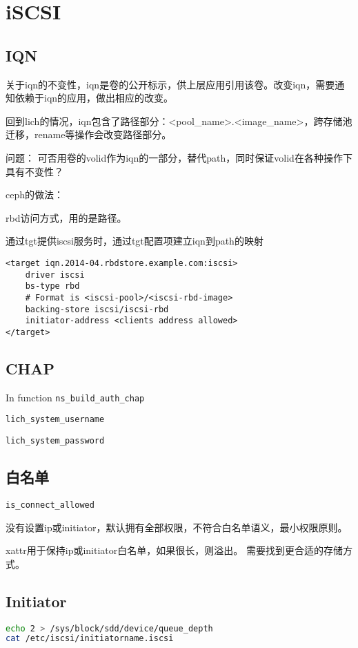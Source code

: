 \chapter{iSCSI}

\section{IQN}

关于iqn的不变性，iqn是卷的公开标示，供上层应用引用该卷。改变iqn，需要通知依赖于iqn的应用，做出相应的改变。

回到lich的情况，iqn包含了路径部分：<pool\_name>.<image\_name>，跨存储池迁移，rename等操作会改变路径部分。

问题： 可否用卷的volid作为iqn的一部分，替代path，同时保证volid在各种操作下具有不变性？

ceph的做法：
\begin{compactenum}
\item rbd访问方式，用的是路径。
\item 通过tgt提供iscsi服务时，通过tgt配置项建立iqn到path的映射
\end{compactenum}

\begin{lstlisting}[frame=single]
<target iqn.2014-04.rbdstore.example.com:iscsi>
    driver iscsi
    bs-type rbd
    # Format is <iscsi-pool>/<iscsi-rbd-image>
    backing-store iscsi/iscsi-rbd  
    initiator-address <clients address allowed>
</target>
\end{lstlisting}

\section{CHAP}

In function \verb|ns_build_auth_chap|
\begin{compactitem}
\item \verb|lich_system_username|
\item \verb|lich_system_password|
\end{compactitem}

\section{白名单}

\begin{compactitem}
\item \verb|is_connect_allowed|
\end{compactitem}

没有设置ip或initiator，默认拥有全部权限，不符合白名单语义，最小权限原则。

xattr用于保持ip或initiator白名单，如果很长，则溢出。
需要找到更合适的存储方式。

\section{Initiator}

\begin{lstlisting}[language=bash,frame=single]
echo 2 > /sys/block/sdd/device/queue_depth
cat /etc/iscsi/initiatorname.iscsi
\end{lstlisting}
